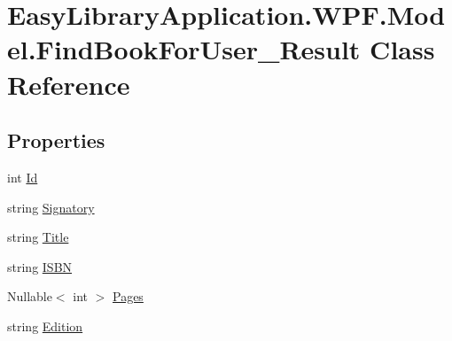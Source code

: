\hypertarget{class_easy_library_application_1_1_w_p_f_1_1_model_1_1_find_book_for_user___result}{}\section{Easy\+Library\+Application.\+W\+P\+F.\+Model.\+Find\+Book\+For\+User\+\_\+\+Result Class Reference}
\label{class_easy_library_application_1_1_w_p_f_1_1_model_1_1_find_book_for_user___result}
\subsection*{Properties}
\begin{DoxyCompactItemize}
\item 
int \mbox{\hyperlink{class_easy_library_application_1_1_w_p_f_1_1_model_1_1_find_book_for_user___result_ae3bae7aaaf1bea5c0561a10b07b50c05}{Id}}
\item 
string \mbox{\hyperlink{class_easy_library_application_1_1_w_p_f_1_1_model_1_1_find_book_for_user___result_aef3c16df29b2d8fc9b77c7df400dbb8b}{Signatory}}
\item 
string \mbox{\hyperlink{class_easy_library_application_1_1_w_p_f_1_1_model_1_1_find_book_for_user___result_abd0517ec3c8900508afa79b57329a8ce}{Title}}
\item 
string \mbox{\hyperlink{class_easy_library_application_1_1_w_p_f_1_1_model_1_1_find_book_for_user___result_a61661b880c102e42a3c91a390e930fc9}{I\+S\+BN}}
\item 
Nullable$<$ int $>$ \mbox{\hyperlink{class_easy_library_application_1_1_w_p_f_1_1_model_1_1_find_book_for_user___result_ae6b397123ee5907d06377444169b6be0}{Pages}}
\item 
string \mbox{\hyperlink{class_easy_library_application_1_1_w_p_f_1_1_model_1_1_find_book_for_user___result_abed5309488e568c3b786c275661e3b16}{Edition}}

\end{DoxyCompactItemize}

